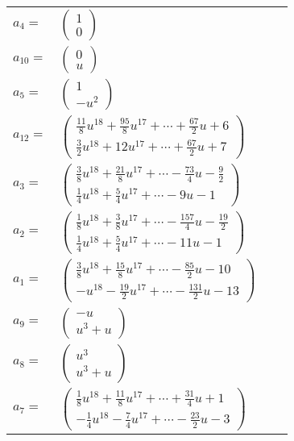 \documentclass[1p]{elsarticle_modified}
\theoremstyle{definition}
\begin{document}
\begin{tabular}{m{7pt} m{180pt} m{7pt} m{180pt} }
\flushright $a_{4}=$&$\begin{pmatrix}1\\0\end{pmatrix}$ \\
\flushright $a_{10}=$&$\begin{pmatrix}0\\u\end{pmatrix}$ \\
\flushright $a_{5}=$&$\begin{pmatrix}1\\- u^2\end{pmatrix}$ \\
\flushright $a_{12}=$&$\begin{pmatrix}\frac{11}{8} u^{18}+\frac{95}{8} u^{17}+\cdots+\frac{67}{2} u+6\\\frac{3}{2} u^{18}+12 u^{17}+\cdots+\frac{67}{2} u+7\end{pmatrix}$ \\
\flushright $a_{3}=$&$\begin{pmatrix}\frac{3}{8} u^{18}+\frac{21}{8} u^{17}+\cdots-\frac{73}{4} u-\frac{9}{2}\\\frac{1}{4} u^{18}+\frac{5}{4} u^{17}+\cdots-9 u-1\end{pmatrix}$ \\
\flushright $a_{2}=$&$\begin{pmatrix}\frac{1}{8} u^{18}+\frac{3}{8} u^{17}+\cdots-\frac{157}{4} u-\frac{19}{2}\\\frac{1}{4} u^{18}+\frac{5}{4} u^{17}+\cdots-11 u-1\end{pmatrix}$ \\
\flushright $a_{1}=$&$\begin{pmatrix}\frac{3}{8} u^{18}+\frac{15}{8} u^{17}+\cdots-\frac{85}{2} u-10\\- u^{18}-\frac{19}{2} u^{17}+\cdots-\frac{131}{2} u-13\end{pmatrix}$ \\
\flushright $a_{9}=$&$\begin{pmatrix}- u\\u^3+u\end{pmatrix}$ \\
\flushright $a_{8}=$&$\begin{pmatrix}u^3\\u^3+u\end{pmatrix}$ \\
\flushright $a_{7}=$&$\begin{pmatrix}\frac{1}{8} u^{18}+\frac{11}{8} u^{17}+\cdots+\frac{31}{4} u+1\\-\frac{1}{4} u^{18}-\frac{7}{4} u^{17}+\cdots-\frac{23}{2} u-3\end{pmatrix}$ \\

\end{tabular}
\end{document}
